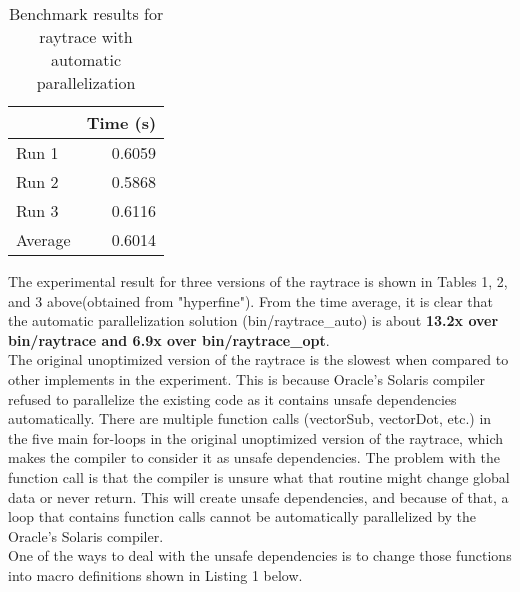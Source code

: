 \documentclass[12pt]{article}
\begin{document}
\begin{table}[H]
  \centering
  \begin{tabular}{lr}
    & {\bf Time (s)} \\
    \hline
    Run 1 & 0.6059 \\
    Run 2 & 0.5868 \\
    Run 3 & 0.6116 \\
    \hline
    Average & 0.6014 \\
  \end{tabular}
  \caption{Benchmark results for raytrace with automatic parallelization}
  \label{tbl-raytrace-automatic}
\end{table}
\newpage
The experimental result for three versions of the raytrace is shown in Tables 1, 2, and 3 above(obtained from "hyperfine"). From the time average, it is clear that the automatic parallelization solution (bin/raytrace\_auto) is about \textbf{13.2x over bin/raytrace and 6.9x over bin/raytrace\_opt}. \\
\indent
The original unoptimized version of the raytrace is the slowest when compared to other implements in the experiment. This is because Oracle’s Solaris compiler refused to parallelize the existing code as it contains unsafe dependencies automatically. There are multiple function calls (vectorSub, vectorDot, etc.) in the five main for-loops in the original unoptimized version of the raytrace, which makes the compiler to consider it as unsafe dependencies. The problem with the function call is that the compiler is unsure what that routine might change global data or never return. This will create unsafe dependencies, and because of that, a loop that contains function calls cannot be automatically parallelized by the Oracle’s Solaris compiler.  \\
\indent
One of the ways to deal with the unsafe dependencies is to change those functions into macro definitions shown in Listing 1 below. 
\end{document}
